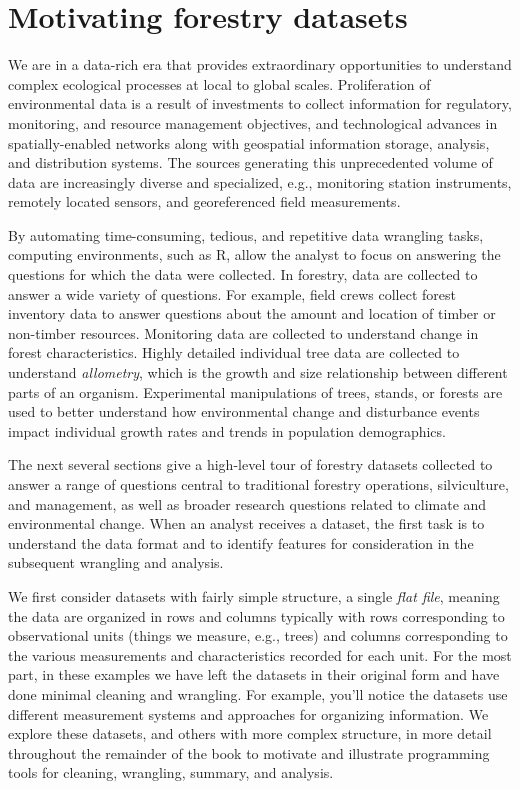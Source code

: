 \documentclass[
  11pt,
]{krantz}
\theoremstyle{definition}
\theoremstyle{definition}
\theoremstyle{definition}
\theoremstyle{definition}
\theoremstyle{remark}
\begin{document}
\hypertarget{datasets}{%
\section{Motivating forestry datasets}\label{datasets}}

We are in a data-rich era that provides extraordinary opportunities to understand complex ecological processes at local to global scales. Proliferation of environmental data is a result of investments to collect information for regulatory, monitoring, and resource management objectives, and technological advances in spatially-enabled networks along with geospatial information storage, analysis, and distribution systems. The sources generating this unprecedented volume of data are increasingly diverse and specialized, e.g., monitoring station instruments, remotely located sensors, and georeferenced field measurements.

By automating time-consuming, tedious, and repetitive data wrangling tasks, computing environments, such as R, allow the analyst to focus on answering the questions for which the data were collected. In forestry, data are collected to answer a wide variety of questions. For example, field crews collect forest inventory data to answer questions about the amount and location of timber or non-timber resources. Monitoring data are collected to understand change in forest characteristics. Highly detailed individual tree data are collected to understand \emph{allometry}, which is the growth and size relationship between different parts of an organism. Experimental manipulations of trees, stands, or forests are used to better understand how environmental change and disturbance events impact individual growth rates and trends in population demographics.

The next several sections give a high-level tour of forestry datasets collected to answer a range of questions central to traditional forestry operations, silviculture, and management, as well as broader research questions related to climate and environmental change. When an analyst receives a dataset, the first task is to understand the data format and to identify features for consideration in the subsequent wrangling and analysis.

We first consider datasets with fairly simple structure, a single \emph{flat file}, meaning the data are organized in rows and columns typically with rows corresponding to observational units (things we measure, e.g., trees) and columns corresponding to the various measurements and characteristics recorded for each unit. For the most part, in these examples we have left the datasets in their original form and have done minimal cleaning and wrangling. For example, you'll notice the datasets use different measurement systems and approaches for organizing information. We explore these datasets, and others with more complex structure, in more detail throughout the remainder of the book to motivate and illustrate programming tools for cleaning, wrangling, summary, and analysis.
\end{document}
